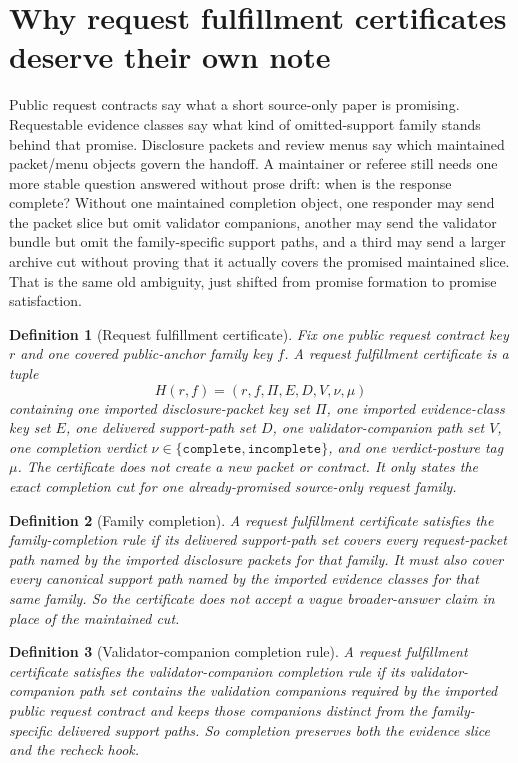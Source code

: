 \documentclass[11pt]{article}
\newtheorem{definition}{Definition}
\begin{document}
\section{Why request fulfillment certificates deserve their own note}
Public request contracts say what a short source-only paper is promising.
Requestable evidence classes say what kind of omitted-support family stands behind that promise.
Disclosure packets and review menus say which maintained packet/menu objects govern the handoff.
A maintainer or referee still needs one more stable question answered without prose drift: when is the response complete?
Without one maintained completion object, one responder may send the packet slice but omit validator companions, another may send the validator bundle but omit the family-specific support paths, and a third may send a larger archive cut without proving that it actually covers the promised maintained slice.
That is the same old ambiguity, just shifted from promise formation to promise satisfaction.

\begin{definition}[Request fulfillment certificate]
Fix one public request contract key $r$ and one covered public-anchor family key $f$.
A \emph{request fulfillment certificate} is a tuple
\[
H(r,f)=(r,f,\Pi,E,D,V,\nu,\mu)
\]
containing one imported disclosure-packet key set $\Pi$, one imported evidence-class key set $E$, one delivered support-path set $D$, one validator-companion path set $V$, one completion verdict $\nu\in\{\texttt{complete},\texttt{incomplete}\}$, and one verdict-posture tag $\mu$.
The certificate does not create a new packet or contract.
It only states the exact completion cut for one already-promised source-only request family.
\end{definition}

\begin{definition}[Family completion]
A request fulfillment certificate satisfies the \emph{family-completion rule} if its delivered support-path set covers every request-packet path named by the imported disclosure packets for that family.
It must also cover every canonical support path named by the imported evidence classes for that same family.
So the certificate does not accept a vague broader-answer claim in place of the maintained cut.
\end{definition}

\begin{definition}[Validator-companion completion rule]
A request fulfillment certificate satisfies the \emph{validator-companion completion rule} if its validator-companion path set contains the validation companions required by the imported public request contract and keeps those companions distinct from the family-specific delivered support paths.
So completion preserves both the evidence slice and the recheck hook.
\end{definition}
\end{document}
